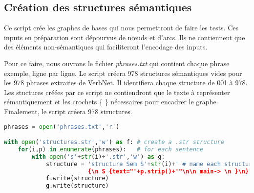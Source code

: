 \subsection{Création des structures sémantiques}\label{sec:pythonstruc}

Ce script crée les graphes de bases qui nous permettront de faire les tests. Ces inputs en préparation sont dépourvus de n\oe{}uds et d'arcs. Ils ne contiennent que des éléments non-sémantiques qui faciliteront l'encodage des inputs.

Pour ce faire, nous ouvrons le fichier \emph{phrases.txt} qui contient chaque phrase exemple, ligne par ligne. Le script créera 978 structures sémantiques vides pour les 978 phrases extraites de VerbNet. Il identifiera chaque structure de 001 à 978. Les stuctures créées par ce script ne contiendront que le texte à représenter sémantiquement et les crochets \{ \} nécessaires pour encadrer le graphe. Finalement, le script créera 978 structures.

\begin{lstlisting}[language=Python, caption = Code pour créer les structures sémantiques vides, label=structurepython]
phrases = open('phrases.txt','r')

with open('structures.str','w') as f: # create a .str structure
    for(i,p) in enumerate(phrases):   # for each sentence
        with open('s'+str(i)+'.str','w') as g:
            structure = 'structure Sem S'+str(i)+' # name each structure by enumeration
						{\n S {text="'+p.strip()+'"\n\n main-> \n }\n}' # insert as texte the sentence
            f.write(structure)
            g.write(structure)
\end{lstlisting}

